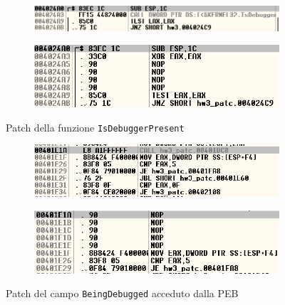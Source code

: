 \documentclass{article}
\begin{document}
\vspace{10cm}

\begin{figure}[!h]
\begin{subfigure}{0.5\textwidth}
\includegraphics[scale=0.3]{immagini/odbg_1_before}
\end{subfigure}
\begin{subfigure}{0.5\textwidth}
\includegraphics[scale=0.3]{immagini/odbg_1_after}
\end{subfigure}
\caption{Patch della funzione \texttt{IsDebuggerPresent}}
\label{Fig3}
\end{figure}

\begin{figure}[!h]
\begin{subfigure}{0.5\textwidth}
\includegraphics[scale=0.3]{immagini/odbg_2_before}
\end{subfigure}
\begin{subfigure}{0.5\textwidth}
\includegraphics[scale=0.3]{immagini/odbg_2_after}
\end{subfigure}
\caption{Patch del campo \texttt{BeingDebugged} acceduto dalla PEB}
\label{Fig4}
\end{figure}
\end{document}
